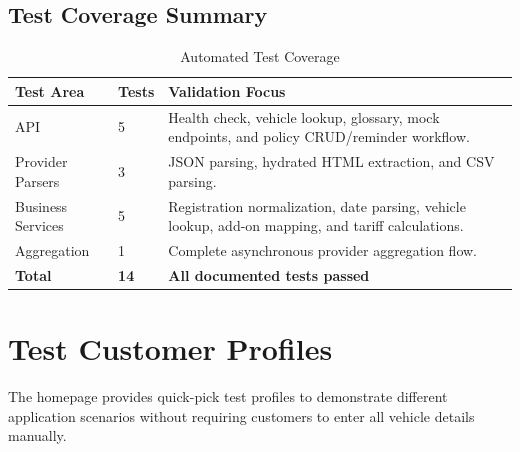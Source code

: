\documentclass[11pt,a4paper]{article}
\begin{document}
\subsection{Test Coverage Summary}

\begin{table}[H]
\centering
\caption{Automated Test Coverage}
\begin{tabularx}{\textwidth}{L{3.5cm}C{2cm}Y}
\toprule
\textbf{Test Area} &
\textbf{Tests} &
\textbf{Validation Focus} \\
\midrule

API &
5 &
Health check, vehicle lookup, glossary, mock endpoints,
and policy CRUD/reminder workflow. \\

Provider Parsers &
3 &
JSON parsing, hydrated HTML extraction, and CSV parsing. \\

Business Services &
5 &
Registration normalization, date parsing, vehicle lookup,
add-on mapping, and tariff calculations. \\

Aggregation &
1 &
Complete asynchronous provider aggregation flow. \\

\midrule
\textbf{Total} & \textbf{14} & \textbf{All documented tests passed} \\
\bottomrule
\end{tabularx}
\end{table}


\section{Test Customer Profiles}

The homepage provides quick-pick test profiles to demonstrate
different application scenarios without requiring customers
to enter all vehicle details manually.
\end{document}

